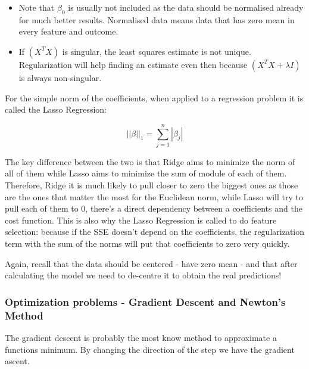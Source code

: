 \begin{itemize}
    \item Note that $\beta_0$ is usually not included as the data should be normalised already for much better results. Normalised data means data that has zero mean in every feature and outcome.
    \item If $\left(X^TX\right)$ is singular, the least squares estimate is not unique. Regularization will help finding an estimate even then because $\left(X^TX + \lambda I\right)$ is always non-singular.
\end{itemize}

For the simple norm of the coefficients, when applied to a regression problem it is called the Lasso Regression:


\begin{equation}
    ||\beta||_1 = \sum_{j=1}^{n} |\beta_j|
\end{equation}

The key difference between the two is that Ridge aims to minimize the norm of all of them while Lasso aims to minimize the sum of module of each of them. Therefore, Ridge it is much likely to pull closer to zero the biggest ones as those are the ones that matter the most for the Euclidean norm, while Lasso will try to pull each of them to 0, there's a direct dependency between a coefficients and the cost function. This is also why the Lasso Regression is called to do feature selection: because if the SSE doesn't depend on the coefficients, the regularization term with the sum of the norms will put that coefficients to zero very quickly.




Again, recall that the data should be centered - have zero mean - and that after calculating the model we need to de-centre it to obtain the real predictions!

\subsubsection{Optimization problems - Gradient Descent and Newton's Method}

The gradient descent is probably the most know method to approximate a functions minimum. By changing the direction of the step we have the gradient ascent. 


